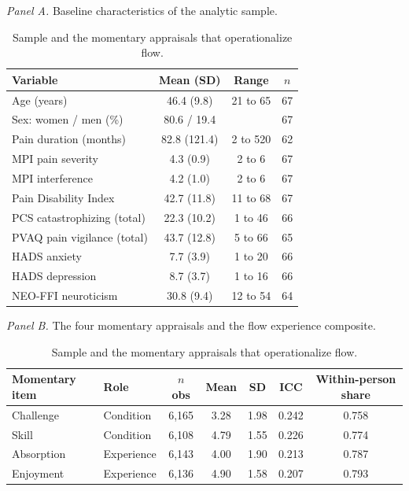 \begin{table}[!htbp]
\raggedright
\caption{Sample and the momentary appraisals that operationalize flow.}
\label{tab:frame}
\footnotesize
\begingroup
\setlength{\tabcolsep}{4pt}
\renewcommand{\arraystretch}{1.08}
\noindent\textit{Panel A.} Baseline characteristics of the analytic sample.\par\vspace{2pt}
\begin{tabular*}{\textwidth}{@{\extracolsep{\fill}}lccc@{}}
\toprule
Variable & Mean (SD) & Range & $n$ \\
\midrule
Age (years) & 46.4 (9.8) & 21 to 65 & 67 \\
Sex: women / men (\%) & 80.6 / 19.4 &  & 67 \\
Pain duration (months) & 82.8 (121.4) & 2 to 520 & 62 \\
MPI pain severity & 4.3 (0.9) & 2 to 6 & 67 \\
MPI interference & 4.2 (1.0) & 2 to 6 & 67 \\
Pain Disability Index & 42.7 (11.8) & 11 to 68 & 67 \\
PCS catastrophizing (total) & 22.3 (10.2) & 1 to 46 & 66 \\
PVAQ pain vigilance (total) & 43.7 (12.8) & 5 to 66 & 65 \\
HADS anxiety & 7.7 (3.9) & 1 to 20 & 66 \\
HADS depression & 8.7 (3.7) & 1 to 16 & 66 \\
NEO-FFI neuroticism & 30.8 (9.4) & 12 to 54 & 64 \\
\bottomrule
\end{tabular*}
\par\vspace{6pt}\noindent\textit{Panel B.} The four momentary appraisals and the flow experience composite.\par\vspace{2pt}
\begin{tabular*}{\textwidth}{@{\extracolsep{\fill}}llccccc@{}}
\toprule
Momentary item & Role & $n$ obs & Mean & SD & ICC & Within-person share \\
\midrule
Challenge & Condition & 6,165 & 3.28 & 1.98 & 0.242 & 0.758 \\
Skill & Condition & 6,108 & 4.79 & 1.55 & 0.226 & 0.774 \\
Absorption & Experience & 6,143 & 4.00 & 1.90 & 0.213 & 0.787 \\
Enjoyment & Experience & 6,136 & 4.90 & 1.58 & 0.207 & 0.793 \\

\end{tabular*}
\end{table}
